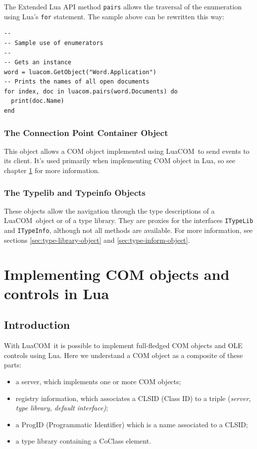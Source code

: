 \documentclass[11pt,a4paper,english]{report}
\newcommand{\ident}[1]{\mbox{\texttt{#1}}}
\newcommand{\techname}[1]{\mbox{#1}}
\newcommand{\luacom}{\techname{LuaCOM}}
\begin{document}
The Extended Lua API method \ident{pairs} allows the traversal of the
enumeration using Lua's \ident{for} statement. The sample above can be
rewritten this way:

\begin{verbatim}
--
-- Sample use of enumerators
--
-- Gets an instance
word = luacom.GetObject("Word.Application")
-- Prints the names of all open documents
for index, doc in luacom.pairs(word.Documents) do
  print(doc.Name)
end
\end{verbatim}



\subsection{The Connection Point Container Object}

This object allows a COM object implemented using \luacom\ to send
events to its client. It's used primarily when implementing COM object
in Lua, so see chapter \ref{sec:impl-com-objects} for more
information.

\subsection{The Typelib and Typeinfo Objects}
These objects allow the navigation through the type descriptions of a
\luacom\ object or of a type library. They are proxies for the
interfaces \ident{ITypeLib} and \ident{ITypeInfo}, although not all
methods are available. For more information, see sections
\ref{sec:type-library-object} and \ref{sec:type-inform-object}.





\chapter{Implementing COM objects and controls in Lua}
\label{sec:impl-com-objects}

\section{Introduction}
With \luacom\ it is possible to implement full-fledged COM objects
and OLE controls using Lua. Here we understand a COM object as a
composite of these parts:

\begin{itemize}
\item a server, which implements one or more COM objects;
\item registry information, which associates a CLSID (Class ID) to
a triple (\emph{server, type library, default interface)};
\item a ProgID (Programmatic Identifier) which is a name associated to
a CLSID;
\item a type library containing a CoClass element.
\end{itemize}
\end{document}
